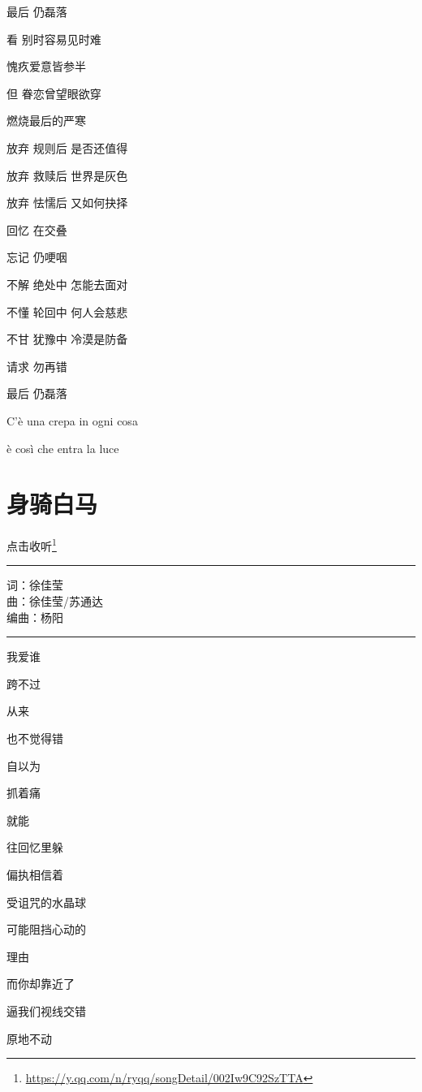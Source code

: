 \documentclass[]{ctexbook}
\renewcommand{\href}[2]{#2\footnote{\url{#1}}}
\begin{document}
最后 仍磊落

看 别时容易见时难

愧疚爱意皆参半

但 眷恋曾望眼欲穿

燃烧最后的严寒

放弃 规则后 是否还值得

放弃 救赎后 世界是灰色

放弃 怯懦后 又如何抉择

回忆 在交叠

忘记 仍哽咽

不解 绝处中 怎能去面对

不懂 轮回中 何人会慈悲

不甘 犹豫中 冷漠是防备

请求 勿再错

最后 仍磊落

C'è una crepa in ogni cosa

è così che entra la luce

\section*{身骑白马}\label{Rading-white-horse}


\href{https://y.qq.com/n/ryqq/songDetail/002Iw9C92SzTTA}{点击收听}

\begin{center}\rule{0.5\linewidth}{0.5pt}\end{center}

词：徐佳莹\\
曲：徐佳莹/苏通达\\
编曲：杨阳

\begin{center}\rule{0.5\linewidth}{0.5pt}\end{center}

我爱谁

跨不过

从来

也不觉得错

自以为

抓着痛

就能

往回忆里躲

偏执相信着

受诅咒的水晶球

可能阻挡心动的

理由

而你却靠近了

逼我们视线交错

原地不动
\end{document}
